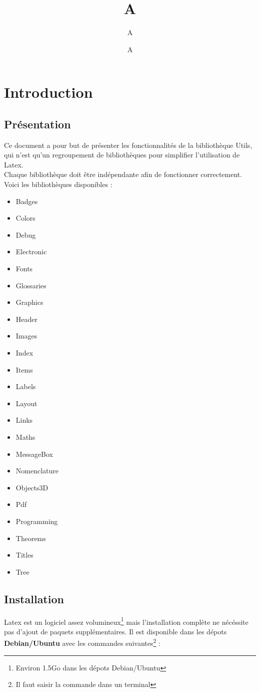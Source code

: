 \documentclass[12pt]{report}
\title{#1}
\author{#2}
\date{#3}
\newcommand{\setHeader}[3]{
\title{#1}
\author{#2}
\date{#3}
\maketitle
}
\newcommand{\Circle}{$\circ$}
\newenvironment{items}[2]
{      
        \begin{itemize}[font=\color{#1}, label=#2]  
    }
    { 
        \end{itemize}
}%
\renewcommand{\bold}[1]{\textbf{#1}}
\newcommand{\n}{\\}
\begin{document}
\setHeader{A}{A}{A}
\tableofcontents
\setcounter{page}{2}
\chapter{Introduction}

\section{Présentation}
Ce document a pour but de présenter les fonctionnalités de la bibliothèque Utils, qui n'est qu'un regroupement de bibliothèques pour simplifier l'utilisation de Latex. \n
Chaque bibliothèque doit être indépendante afin de fonctionner correctement.\\

Voici les bibliothèques disponibles : 

\begin{items}{blue}{\Circle}
\item Badges
\item Colors
\item Debug
\item Electronic
\item Fonts
\item Glossaries
\item Graphics
\item Header
\item Images
\item Index
\item Items
\item Labels
\item Layout
\item Links
\item Maths
\item MessageBox
\item Nomenclature
\item Objects3D
\item Pdf
\item Programming
\item Theorems
\item Titles
\item Tree
\end{items}

\section{Installation}

Latex est un logiciel assez volumineux\footnote{Environ 1.5Go dans les dépots Debian/Ubuntu} mais l'installation complète ne nécéssite pas d'ajout de paquets supplémentaires.
Il est disponible dans les dépots \bold{Debian/Ubuntu} avec les commandes suivantes\footnote{Il faut saisir la commande dans un terminal} :\\
\end{document}
